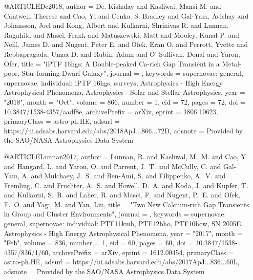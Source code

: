 \documentclass[twocolumn,tighten]{aastex63}
\begin{document}
{@ARTICLE{De2018,
       author = {{De}, Kishalay and {Kasliwal}, Mansi M. and {Cantwell}, Therese and
         {Cao}, Yi and {Cenko}, S. Bradley and {Gal-Yam}, Avishay and
         {Johansson}, Joel and {Kong}, Albert and {Kulkarni}, Shrinivas R. and
         {Lunnan}, Ragnhild and {Masci}, Frank and {Matuszewski}, Matt and
         {Mooley}, Kunal P. and {Neill}, James D. and {Nugent}, Peter E. and
         {Ofek}, Eran O. and {Perrott}, Yvette and {Rebbapragada}, Umaa D. and
         {Rubin}, Adam and {O' Sullivan}, Donal and {Yaron}, Ofer},
        title = "{iPTF 16hgs: A Double-peaked Ca-rich Gap Transient in a Metal-poor, Star-forming Dwarf Galaxy}",
      journal = {\apj},
     keywords = {supernovae: general, supernovae: individual: iPTF 16hgs, surveys, Astrophysics - High Energy Astrophysical Phenomena, Astrophysics - Solar and Stellar Astrophysics},
         year = "2018",
        month = "Oct",
       volume = {866},
       number = {1},
          eid = {72},
        pages = {72},
          doi = {10.3847/1538-4357/aadf8e},
archivePrefix = {arXiv},
       eprint = {1806.10623},
 primaryClass = {astro-ph.HE},
       adsurl = {https://ui.adsabs.harvard.edu/abs/2018ApJ...866...72D},
      adsnote = {Provided by the SAO/NASA Astrophysics Data System}
}

@ARTICLE{Lunnan2017,
       author = {{Lunnan}, R. and {Kasliwal}, M.~M. and {Cao}, Y. and {Hangard}, L. and
         {Yaron}, O. and {Parrent}, J.~T. and {McCully}, C. and {Gal-Yam}, A. and
         {Mulchaey}, J.~S. and {Ben-Ami}, S. and {Filippenko}, A.~V. and
         {Fremling}, C. and {Fruchter}, A.~S. and {Howell}, D.~A. and
         {Koda}, J. and {Kupfer}, T. and {Kulkarni}, S.~R. and {Laher}, R. and
         {Masci}, F. and {Nugent}, P.~E. and {Ofek}, E.~O. and {Yagi}, M. and
         {Yan}, Lin},
        title = "{Two New Calcium-rich Gap Transients in Group and Cluster Environments}",
      journal = {\apj},
     keywords = {supernovae: general, supernovae: individual: PTF11kmb, PTF12bho, PTF10hcw, SN 2005E, Astrophysics - High Energy Astrophysical Phenomena},
         year = "2017",
        month = "Feb",
       volume = {836},
       number = {1},
          eid = {60},
        pages = {60},
          doi = {10.3847/1538-4357/836/1/60},
archivePrefix = {arXiv},
       eprint = {1612.00454},
 primaryClass = {astro-ph.HE},
       adsurl = {https://ui.adsabs.harvard.edu/abs/2017ApJ...836...60L},
      adsnote = {Provided by the SAO/NASA Astrophysics Data System}
}

}
\end{document}
